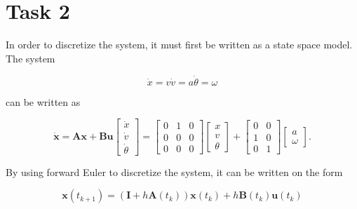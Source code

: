 \documentclass{article}
\begin{document}
\section*{Task 2}
In order to discretize the system, it must first be written as a state space model. The system

\begin{subequations}
\begin{equation}
	\dot{x} = v 
\end{equation}
\begin{equation}
	\dot{v} = a
\end{equation}
\begin{equation}
	\dot{\theta} = \omega
\end{equation}
\end{subequations}

can be written as

\begin{subequations}
\begin{equation}
	\dot{\bm{x}} = \bm{A}\bm{x} + \bm{B}\bm{u}
\end{equation}
\begin{equation}
	\begin{bmatrix}
		\dot{x} \\ \dot{v} \\ \dot{\theta}
	\end{bmatrix}
	=
	\begin{bmatrix}
		0 & 1 & 0 \\
		0 & 0 & 0 \\
		0 & 0 & 0
	\end{bmatrix}
	\begin{bmatrix}
		x \\ v \\ \theta
	\end{bmatrix}
	+
	\begin{bmatrix}
		0 & 0 \\
		1 & 0 \\
		0 & 1
	\end{bmatrix}
	\begin{bmatrix}
		a \\ \omega
	\end{bmatrix}
	.
\end{equation}
\end{subequations}

By using forward Euler to discretize the system, it can be written on the form

\begin{equation}
	\label{eq:euler}
	\bm{x}(t_{k+1}) = (\bm{I} + h\bm{A}(t_k))\bm{x}(t_k) + h\bm{B}(t_k)\bm{u}(t_k)
\end{equation}
\end{document}
